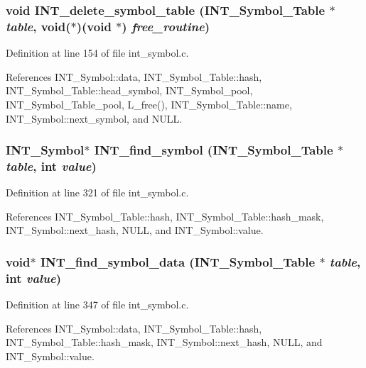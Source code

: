 \subsubsection{\setlength{\rightskip}{0pt plus 5cm}void INT\_\-delete\_\-symbol\_\-table (\bf{INT\_\-Symbol\_\-Table} $\ast$ {\em table}, void($\ast$)(void $\ast$) {\em free\_\-routine})}\label{int__symbol_8c_c7eeab5d805b089e062bb7e6204ddbf0}




Definition at line 154 of file int\_\-symbol.c.

References INT\_\-Symbol::data, INT\_\-Symbol\_\-Table::hash, INT\_\-Symbol\_\-Table::head\_\-symbol, INT\_\-Symbol\_\-pool, INT\_\-Symbol\_\-Table\_\-pool, L\_\-free(), INT\_\-Symbol\_\-Table::name, INT\_\-Symbol::next\_\-symbol, and NULL.
\subsubsection{\setlength{\rightskip}{0pt plus 5cm}\bf{INT\_\-Symbol}$\ast$ INT\_\-find\_\-symbol (\bf{INT\_\-Symbol\_\-Table} $\ast$ {\em table}, int {\em value})}\label{int__symbol_8c_4b4e1a84b31fad39d8a62e2920c3f1a2}




Definition at line 321 of file int\_\-symbol.c.

References INT\_\-Symbol\_\-Table::hash, INT\_\-Symbol\_\-Table::hash\_\-mask, INT\_\-Symbol::next\_\-hash, NULL, and INT\_\-Symbol::value.
\subsubsection{\setlength{\rightskip}{0pt plus 5cm}void$\ast$ INT\_\-find\_\-symbol\_\-data (\bf{INT\_\-Symbol\_\-Table} $\ast$ {\em table}, int {\em value})}\label{int__symbol_8c_3022f18360abe8bea56f9cdd41807741}




Definition at line 347 of file int\_\-symbol.c.

References INT\_\-Symbol::data, INT\_\-Symbol\_\-Table::hash, INT\_\-Symbol\_\-Table::hash\_\-mask, INT\_\-Symbol::next\_\-hash, NULL, and INT\_\-Symbol::value.
